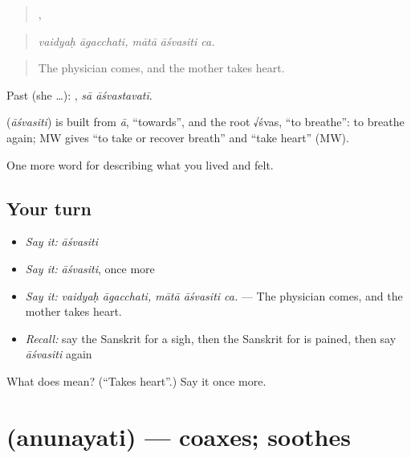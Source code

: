 \begin{quote}
 ,   
\end{quote}

\begin{quote}
\emph{vaidyaḥ āgacchati, mātā āśvasiti ca.}
\end{quote}

\begin{quote}
The physician comes, and the mother takes heart.
\end{quote}

Past (she …):  , \emph{sā āśvastavatī}.

\begin{cousinweb}
\textbf{} (\emph{āśvasiti}) is built from \emph{ā}, \textquotedblleft{}towards\textquotedblright{}, and the root √śvas, \textquotedblleft{}to breathe\textquotedblright{}: to breathe again; MW gives \textquotedblleft{}to take or recover breath\textquotedblright{} and \textquotedblleft{}take heart\textquotedblright{} (MW).
\end{cousinweb}

\begin{grammarlens}[title={What you've built}]
One more word for describing what you lived and felt.
\end{grammarlens}

\subsection*{Your turn}
\begin{itemize}
\raggedright
  \item \emph{Say it:} \emph{āśvasiti}
  \item \emph{Say it:} \emph{āśvasiti}, once more
  \item \emph{Say it:} \emph{vaidyaḥ āgacchati, mātā āśvasiti ca.} — The physician comes, and the mother takes heart.
  \item \emph{Recall:} say the Sanskrit for a sigh, then the Sanskrit for is pained, then say \emph{āśvasiti} again
\end{itemize}

\begin{tcolorbox}[breakable,colback=teal!4,colframe=teal!35!black,title={Before you move on}]
What does  mean? (\textquotedblleft{}Takes heart\textquotedblright{}.) Say it once more.
\end{tcolorbox}
\section[\texorpdfstring{\sk{अनुनयति} (anunayati)}{अनुनयति (anunayati)}]{ (anunayati) — coaxes; soothes}

